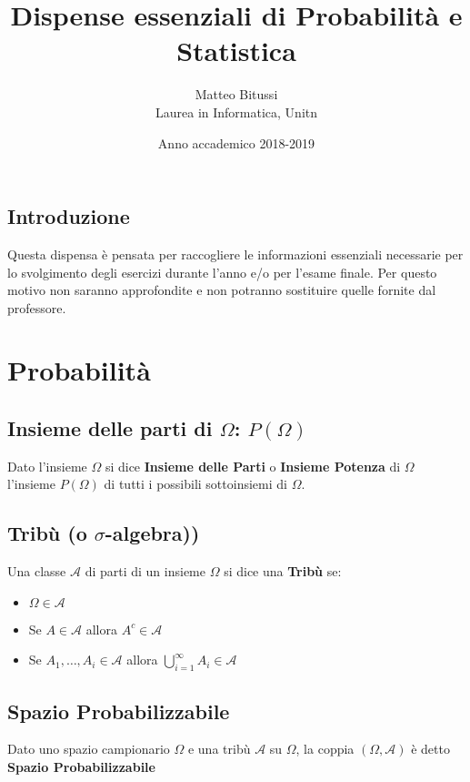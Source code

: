 \documentclass[a4paper]{report}
\title{Dispense essenziali di Probabilità e Statistica}
\author{Matteo Bitussi \\ Laurea in Informatica, Unitn}
\date{Anno accademico 2018-2019}
\begin{document}
  \maketitle

  \tableofcontents

  \section*{Introduzione}
  Questa dispensa è pensata per raccogliere le informazioni essenziali necessarie per lo svolgimento degli esercizi durante l'anno e/o per l'esame finale. Per questo motivo non saranno approfondite e non potranno sostituire quelle fornite dal professore.

  \chapter{Probabilità}

  \section{Insieme delle parti di $\Omega$: $P(\Omega)$}
  Dato l'insieme $\Omega$ si dice \textbf{Insieme delle Parti} o \textbf{Insieme Potenza} di $\Omega$ l'insieme $P(\Omega)$ di tutti i possibili sottoinsiemi di $\Omega$.

  \section{Tribù (o $\sigma$-algebra))}
  Una classe $\mathcal{A}$ di parti di un insieme $\Omega$ si dice una \textbf{Tribù} se:\\
  \begin{itemize}
  \item $\Omega \in \mathcal{A}$
  \item Se $A \in \mathcal{A}$ allora $A^c \in \mathcal{A}$
  \item Se $A_1, \dots ,A_i \in \mathcal{A}$ allora $\bigcup\limits_{i=1}^{\infty} A_{i} \in \mathcal{A}$
  \end{itemize}

  \section{Spazio Probabilizzabile}
  Dato uno spazio campionario $\Omega$ e una tribù $\mathcal{A}$ su $\Omega$, la coppia $(\Omega,\mathcal{A})$ è detto \textbf{Spazio Probabilizzabile}
\end{document}
